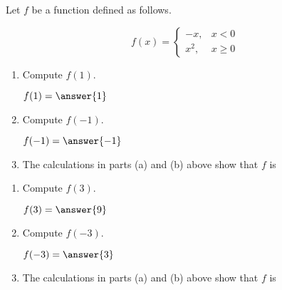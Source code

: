 \documentclass{ximera}
\author{Kenneth Berglund}
\begin{document}
Let $f$ be a function defined as follows.

$$
f(x) = \begin{cases}
-x, & x < 0 \\
x^2, & x \ge 0
\end{cases}
$$

\begin{exercise}
\begin{enumerate}
\item Compute $f(1)$.

$f(1) = \answer{1}$ 

\item Compute $f(-1)$.

$f(-1) = \answer{-1}$

\item The calculations in parts (a) and (b) above show that $f$ is
\begin{multipleChoice}
\end{multipleChoice}
\end{enumerate}
\end{exercise}
\begin{exercise}
\begin{enumerate}
\item Compute $f(3)$.

$f(3) = \answer{9}$ 

\item Compute $f(-3)$.

$f(-3) = \answer{3}$

\item The calculations in parts (a) and (b) above show that $f$ is
\begin{multipleChoice}
\end{multipleChoice}
	
\end{enumerate}

\end{exercise}
\end{document}
